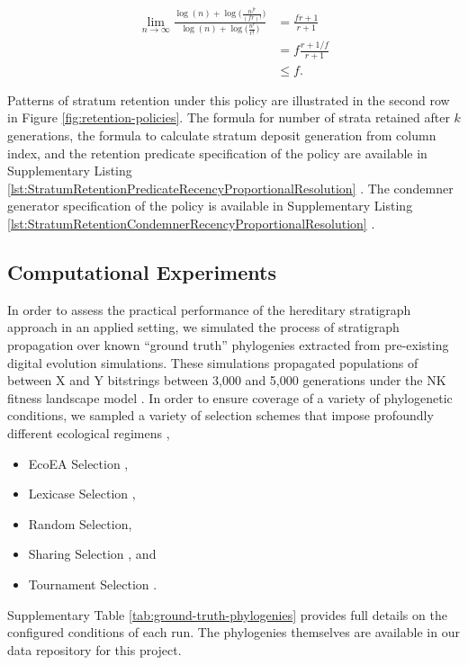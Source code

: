 \begin{align*}
\lim_{n \to \infty}
\frac{
  \log(n) + \log\Big(\frac{n^{fr}}{(fr)!}\Big)
}{
  \log(n) + \log\Big(\frac{n^r}{r!}\Big)
}
&= \frac{fr+1}{r+1}\\
&= f\frac{r + 1/f}{r + 1}\\
&\leq f.
\end{align*}

Patterns of stratum retention under this policy are illustrated in the second row in Figure \ref{fig:retention-policies}.
The formula for number of strata retained after $k$ generations, the formula to calculate stratum deposit generation from column index, and the retention predicate specification of the policy are available in Supplementary Listing \ref{lst:StratumRetentionPredicateRecencyProportionalResolution} \citep{moreno2022hstratconceptsupplement}.
The condemner generator specification of the policy is available in Supplementary Listing \ref{lst:StratumRetentionCondemnerRecencyProportionalResolution} \citep{moreno2022hstratconceptsupplement}.


\subsection{Computational Experiments}

In order to assess the practical performance of the hereditary stratigraph approach in an applied setting, we simulated the process of stratigraph propagation over known ``ground truth'' phylogenies extracted from pre-existing digital evolution simulations.
These simulations propagated populations of between X and Y bitstrings between 3,000 and 5,000 generations under the NK fitness landscape model \citep{kauffman1989nk}.
In order to ensure coverage of a variety of phylogenetic conditions, we sampled a variety of selection schemes that impose profoundly different ecological regimens \citep{dolson2018ecological},
\begin{itemize}
  \item EcoEA Selection \citep{goings2012ecology},
  \item Lexicase Selection \citep{helmuth2014solving},
  \item Random Selection,
  \item Sharing Selection \citep{goldberg1987genetic}, and
  \item Tournament Selection \citep{miller1995genetic}.
\end{itemize}

Supplementary Table \ref{tab:ground-truth-phylogenies} provides full details on the configured conditions of each run.
The phylogenies themselves are available in our data repository for this project.

